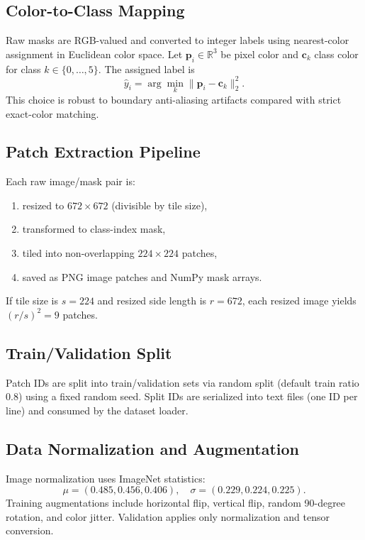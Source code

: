 \documentclass[journal]{IEEEtran}
\begin{document}
\subsection{Color-to-Class Mapping}
Raw masks are RGB-valued and converted to integer labels using nearest-color assignment in Euclidean color space. Let $\mathbf{p}_i\in\mathbb{R}^3$ be pixel color and $\mathbf{c}_k$ class color for class $k\in\{0,\dots,5\}$. The assigned label is
\begin{equation}
\hat{y}_i = \arg\min_k \|\mathbf{p}_i-\mathbf{c}_k\|_2^2.
\end{equation}
This choice is robust to boundary anti-aliasing artifacts compared with strict exact-color matching.

\subsection{Patch Extraction Pipeline}
Each raw image/mask pair is:
\begin{enumerate}
    \item resized to $672\times672$ (divisible by tile size),
    \item transformed to class-index mask,
    \item tiled into non-overlapping $224\times224$ patches,
    \item saved as PNG image patches and NumPy mask arrays.
\end{enumerate}

If tile size is $s=224$ and resized side length is $r=672$, each resized image yields $(r/s)^2=9$ patches.

\subsection{Train/Validation Split}
Patch IDs are split into train/validation sets via random split (default train ratio $0.8$) using a fixed random seed. Split IDs are serialized into text files (one ID per line) and consumed by the dataset loader.

\subsection{Data Normalization and Augmentation}
Image normalization uses ImageNet statistics:
\begin{equation}
\mu=(0.485,0.456,0.406), \quad \sigma=(0.229,0.224,0.225).
\end{equation}
Training augmentations include horizontal flip, vertical flip, random 90-degree rotation, and color jitter. Validation applies only normalization and tensor conversion.
\end{document}

